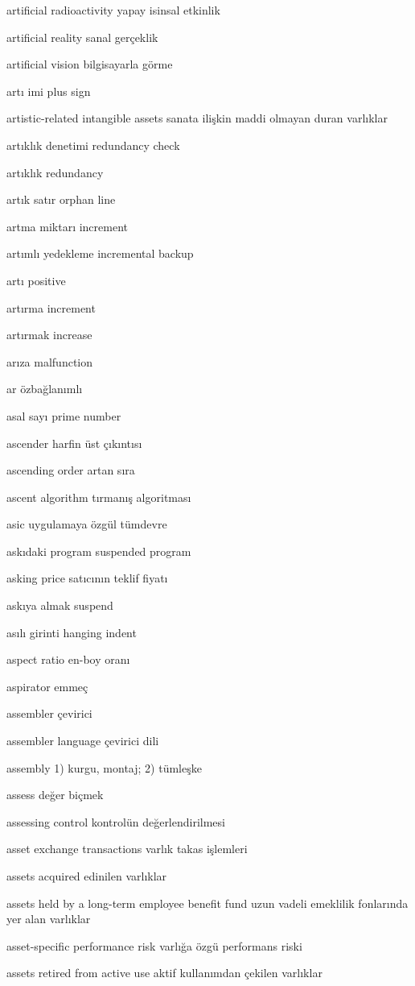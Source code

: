 \documentclass[12pt,fleqn]{article}\usepackage{../../common}
\begin{document}
artificial radioactivity yapay isinsal etkinlik

artificial reality sanal gerçeklik

artificial vision bilgisayarla görme

artı imi plus sign

artistic-related intangible assets sanata ilişkin maddi olmayan duran varlıklar

artıklık denetimi redundancy check

artıklık redundancy

artık satır orphan line

artma miktarı increment

artımlı yedekleme incremental backup

artı positive

artırma increment

artırmak increase

arıza malfunction

ar özbağlanımlı

asal sayı prime number

ascender harfin üst çıkıntısı

ascending order artan sıra

ascent algorithm tırmanış algoritması

asic uygulamaya özgül tümdevre

askıdaki program suspended program

asking price satıcının teklif fiyatı

askıya almak suspend

asılı girinti hanging indent

aspect ratio en-boy oranı

aspirator emmeç

assembler çevirici

assembler language çevirici dili

assembly 1) kurgu, montaj; 2) tümleşke

assess değer biçmek

assessing control kontrolün değerlendirilmesi

asset exchange transactions varlık takas işlemleri

assets acquired edinilen varlıklar

assets held by a long-term employee benefit fund uzun vadeli emeklilik fonlarında yer alan varlıklar

asset-specific performance risk varlığa özgü performans riski

assets retired from active use aktif kullanımdan çekilen varlıklar
\end{document}
